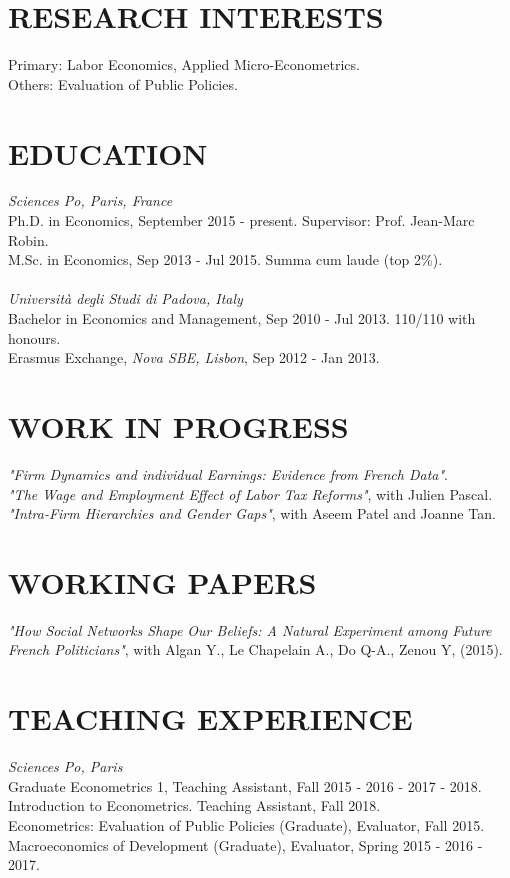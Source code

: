 \documentclass{res}
\begin{document}
\begin{resume}

\section{\small RESEARCH INTERESTS}  
    \vspace{0.02in}	
    Primary: Labor Economics, Applied Micro-Econometrics. \\
    Others: Evaluation of Public Policies. 
 
\section{\small EDUCATION} 
    \vspace{0.02in}	
    \textit{Sciences Po, Paris, France} \\
    Ph.D. in Economics, September 2015 - present. Supervisor: Prof. Jean-Marc Robin.\\
    M.Sc. in Economics, Sep 2013 - Jul 2015. Summa cum laude (top 2\%).\\
    \\[-2pt]        
    \textit{Universit\`{a} degli Studi di Padova, Italy}  \\       
    Bachelor in Economics and Management, Sep 2010 - Jul 2013. 110/110 with honours.\\
    Erasmus Exchange, \textit{Nova SBE, Lisbon}, Sep 2012 - Jan 2013.

\section{\small WORK IN PROGRESS}
\textit{"Firm Dynamics and individual Earnings: Evidence from French Data"}. \\
\textit{"The Wage and Employment Effect of Labor Tax Reforms"}, with Julien Pascal. \\
\textit{"Intra-Firm Hierarchies and Gender Gaps"}, with Aseem Patel and Joanne Tan.

\section{\small WORKING PAPERS}
   \vspace{0.02in}
\textit{"How Social Networks Shape Our Beliefs: A Natural Experiment among Future French Politicians"}, with Algan Y., Le Chapelain A., Do Q-A., Zenou Y, (2015).	
   
\section{\small TEACHING EXPERIENCE}
   \vspace{0.02in}	
   \textit{Sciences Po, Paris} \\
   Graduate Econometrics 1, Teaching Assistant, Fall 2015 - 2016 - 2017 - 2018. \\
   Introduction to Econometrics. Teaching Assistant, Fall 2018. \\
   Econometrics: Evaluation of Public Policies (Graduate), Evaluator, Fall 2015. \\
   Macroeconomics of Development (Graduate), Evaluator, Spring 2015 - 2016 - 2017.


\end{resume}
\end{document}
